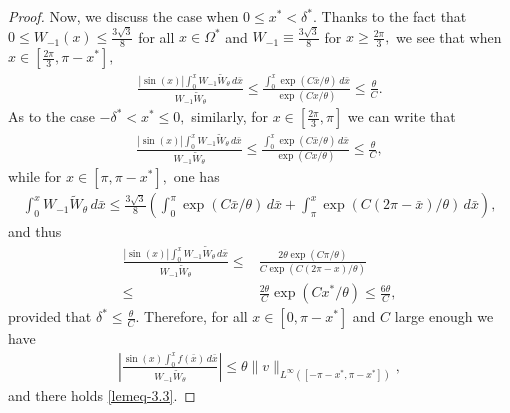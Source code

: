 \documentclass[10pt,a4paper]{amsart}
\begin{document}
\begin{proof}
Now, we discuss the case  when  $0\leq x^*<\delta^*.$ Thanks to  the fact that $0\leq W_{-1}(x)\leq \frac{3\sqrt{3}}{8}$ for all $x\in\Omega^*$ and $W_{-1}\equiv  \frac{3\sqrt{3}}{8}$ for $x\geq \frac{2\pi}{3},$     we see that  when $x\in[\frac{2\pi}{3}, \pi-x^*],$ 
     \begin{align*}
    \frac{ |\sin (x)| \int_0^x W_{-1} \widetilde{W}_\theta \,d\bar x}{W_{-1} \widetilde{W}_\theta}\leq
\frac{\int_0^x  \exp(C\bar x/\theta)\,d\bar x}{\exp(C x/\theta)}\leq \frac{\theta}{C}.
 \end{align*}
As to the case $-\delta^*<x^*\leq0,$  similarly,  for $x\in[\frac{2\pi}{3}, \pi]$ we can write that
 \begin{align*}
    \frac{ |\sin (x)| \int_0^x W_{-1} \widetilde{W}_\theta \,d\bar x}{W_{-1} \widetilde{W}_\theta}\leq
\frac{\int_0^x  \exp(C\bar x/\theta)\,d\bar x}{\exp(C x/\theta)}\leq \frac{\theta}{C},
 \end{align*}
while for $x\in [\pi, \pi-x^*],$ one has 
  \begin{align*}
      \int_0^x W_{-1} \widetilde{W}_\theta \,d\bar x\leq  \frac{3\sqrt{3}}{8}\left(  \int_0^\pi\exp(C\bar x/\theta)\,d\bar x +  \int_\pi^x \exp(C(2\pi-\bar x)/\theta)\,d\bar x\right),
       \end{align*}
and thus
\begin{align*}
    \frac{ |\sin (x)| \int_0^x W_{-1} \widetilde{W}_\theta \,d\bar x}{W_{-1} \widetilde{W}_\theta}\leq&
 \frac{2\theta \exp(C\pi/\theta)}{C\exp(C(2\pi-x)/\theta)}\\
\leq& \frac{2\theta}{C}\exp(Cx^*/\theta)\leq \frac{6\theta}{C},
 \end{align*}
 provided that $\delta^*\leq \frac{\theta}{C}.$
 Therefore, for all $x\in[0, \pi-x^*]$ and $C$ large enough we have 
 \begin{align*}
\left|\frac{\sin ( x) \int_0^{x}f(\bar x)\,d\bar x}{W_{-1}\widetilde W_\theta}\right|\leq \theta \|v\|_{L^\infty([-\pi-x^*, \pi-x^*])},
 \end{align*}
and there holds \eqref{lemeq-3.3}.
 \end{proof}
\end{document}
